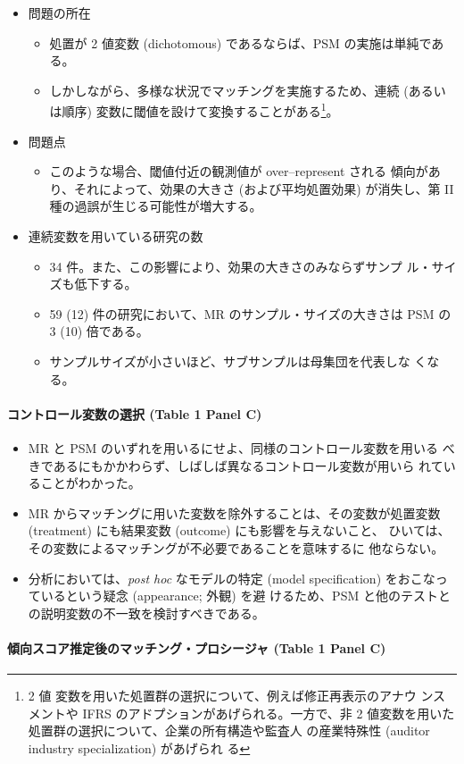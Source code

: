 \begin{itemize}
 \item 問題の所在
       \begin{itemize}
        \item 処置が 2 値変数 (dichotomous) であるならば、PSM の実施は単純である。
        \item しかしながら、多様な状況でマッチングを実施するため、連続 (あるい
              は順序) 変数に閾値を設けて変換することがある\footnote{2 値
              変数を用いた処置群の選択について、例えば修正再表示のアナウ
              ンスメントや IFRS のアドプションがあげられる。一方で、非 2
              値変数を用いた処置群の選択について、企業の所有構造や監査人
              の産業特殊性 (auditor industry specialization) があげられ
              る}。
       \end{itemize}
 \item 問題点
       \begin{itemize}
        \item このような場合、閾値付近の観測値が over--represent される
              傾向があり、それによって、効果の大きさ (および平均処置効果)
              が消失し、第 II 種の過誤が生じる可能性が増大する。
       \end{itemize}
 \item 連続変数を用いている研究の数
       \begin{itemize}
        \item 34 件。また、この影響により、効果の大きさのみならずサンプ
              ル・サイズも低下する。
        \item 59 (12) 件の研究において、MR のサンプル・サイズの大きさは
              PSM の 3 (10) 倍である。
        \item サンプルサイズが小さいほど、サブサンプルは母集団を代表しな
              くなる。
       \end{itemize}
\end{itemize}

\paragraph{コントロール変数の選択 (Table 1 Panel C)}

\begin{itemize}
 \item MR と PSM のいずれを用いるにせよ、同様のコントロール変数を用いる
       べきであるにもかかわらず、しばしば異なるコントロール変数が用いら
       れていることがわかった。
 \item MR からマッチングに用いた変数を除外することは、その変数が処置変数
       (treatment) にも結果変数 (outcome) にも影響を与えないこと、
       ひいては、その変数によるマッチングが不必要であることを意味するに
       他ならない。
 \item 分析においては、\textit{post hoc} なモデルの特定 (model
       specification) をおこなっているという疑念 (appearance; 外観) を避
       けるため、PSM と他のテストとの説明変数の不一致を検討すべきである。
\end{itemize}

\paragraph{傾向スコア推定後のマッチング・プロシージャ (Table 1 Panel C)}

